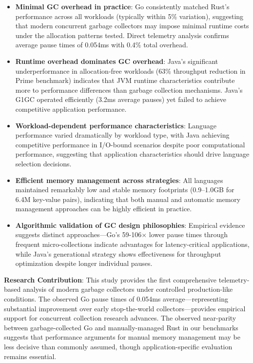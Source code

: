 \documentclass{article}
\begin{document}
\begin{itemize}
  \item \textbf{Minimal GC overhead in practice}: Go consistently matched Rust's performance across all workloads (typically within 5\% variation), suggesting that modern concurrent garbage collectors may impose minimal runtime costs under the allocation patterns tested. Direct telemetry analysis confirms average pause times of 0.054ms with 0.4\% total overhead.
  
  \item \textbf{Runtime overhead dominates GC overhead}: Java's significant underperformance in allocation-free workloads (63\% throughput reduction in Prime benchmark) indicates that JVM runtime characteristics contribute more to performance differences than garbage collection mechanisms. Java's G1GC operated efficiently (3.2ms average pauses) yet failed to achieve competitive application performance.
  
  \item \textbf{Workload-dependent performance characteristics}: Language performance varied dramatically by workload type, with Java achieving competitive performance in I/O-bound scenarios despite poor computational performance, suggesting that application characteristics should drive language selection decisions.
  
  \item \textbf{Efficient memory management across strategies}: All languages maintained remarkably low and stable memory footprints (0.9--1.0GB for 6.4M key-value pairs), indicating that both manual and automatic memory management approaches can be highly efficient in practice.
  
  \item \textbf{Algorithmic validation of GC design philosophies}: Empirical evidence suggests distinct approaches—Go's 59-106$\times$ lower pause times through frequent micro-collections indicate advantages for latency-critical applications, while Java's generational strategy shows effectiveness for throughput optimization despite longer individual pauses.
\end{itemize}

\textbf{Research Contribution}: This study provides the first comprehensive telemetry-based analysis of modern garbage collectors under controlled production-like conditions. The observed Go pause times of 0.054ms average—representing substantial improvement over early stop-the-world collectors—provides empirical support for concurrent collection research advances. The observed near-parity between garbage-collected Go and manually-managed Rust in our benchmarks suggests that performance arguments for manual memory management may be less decisive than commonly assumed, though application-specific evaluation remains essential.
\end{document}
